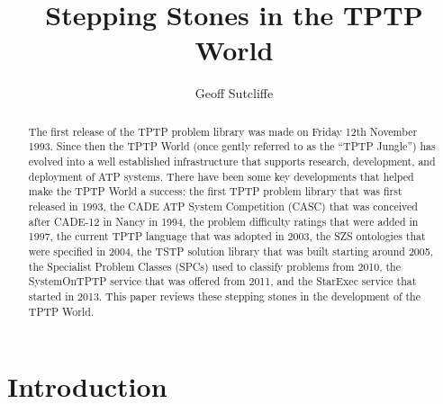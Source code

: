 \documentclass{easychair}
\title{Stepping Stones in the TPTP World}
\author{
  Geoff Sutcliffe
}
\institute{
  University of Miami,
  Miami, USA\\
  \email{geoff@cs.miami.edu}\\
}
\begin{document}
\maketitle

\begin{abstract}
The first release of the TPTP problem library was made on Friday 12th November 1993. 
Since then the TPTP World (once gently referred to as the ``TPTP Jungle'') has evolved into a 
well established infrastructure that supports research, development, and deployment of ATP systems.
There have been some key developments that helped make the TPTP World a success: 
the first TPTP problem library that was first released in 1993, 
the CADE ATP System Competition (CASC) that was conceived after CADE-12 in Nancy in 1994, 
the problem difficulty ratings that were added in 1997, 
the current TPTP language that was adopted in 2003, 
the SZS ontologies that were specified in 2004, 
the TSTP solution library that was built starting around 2005, 
the Specialist Problem Classes (SPCs) used to classify problems from 2010, 
the SystemOnTPTP service that was offered from 2011, 
and 
the StarExec service that started in 2013. 
This paper reviews these stepping stones in the development of the TPTP World.
\end{abstract}
\section{Introduction}
\label{Introduction}
\end{document}
